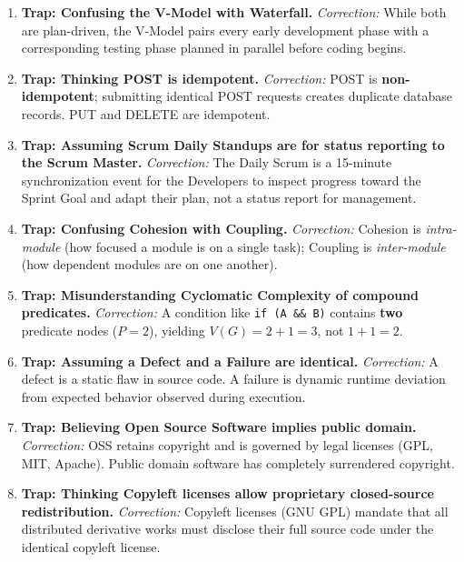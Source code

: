 \begin{enumerate}[label=\arabic*.,leftmargin=2em]
    \item \textbf{Trap: Confusing the V-Model with Waterfall.}
    \textit{Correction:} While both are plan-driven, the V-Model pairs every early development phase with a corresponding testing phase planned in parallel before coding begins.

    \item \textbf{Trap: Thinking POST is idempotent.}
    \textit{Correction:} POST is \textbf{non-idempotent}; submitting identical POST requests creates duplicate database records. PUT and DELETE are idempotent.

    \item \textbf{Trap: Assuming Scrum Daily Standups are for status reporting to the Scrum Master.}
    \textit{Correction:} The Daily Scrum is a 15-minute synchronization event for the Developers to inspect progress toward the Sprint Goal and adapt their plan, not a status report for management.

    \item \textbf{Trap: Confusing Cohesion with Coupling.}
    \textit{Correction:} Cohesion is \textit{intra-module} (how focused a module is on a single task); Coupling is \textit{inter-module} (how dependent modules are on one another).

    \item \textbf{Trap: Misunderstanding Cyclomatic Complexity of compound predicates.}
    \textit{Correction:} A condition like \lstinline|if (A && B)| contains \textbf{two} predicate nodes ($P=2$), yielding $V(G) = 2 + 1 = 3$, not $1 + 1 = 2$.

    \item \textbf{Trap: Assuming a Defect and a Failure are identical.}
    \textit{Correction:} A defect is a static flaw in source code. A failure is dynamic runtime deviation from expected behavior observed during execution.

    \item \textbf{Trap: Believing Open Source Software implies public domain.}
    \textit{Correction:} OSS retains copyright and is governed by legal licenses (GPL, MIT, Apache). Public domain software has completely surrendered copyright.

    \item \textbf{Trap: Thinking Copyleft licenses allow proprietary closed-source redistribution.}
    \textit{Correction:} Copyleft licenses (GNU GPL) mandate that all distributed derivative works must disclose their full source code under the identical copyleft license.


\end{enumerate}
